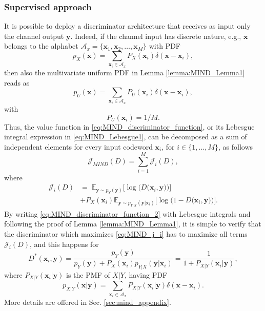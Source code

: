 \subsubsection{Supervised approach}
It is possible to deploy a discriminator architecture that receives as input only the channel output $\mathbf{y}$. Indeed, if the channel input has discrete nature, e.g., $\mathbf{x}$ belongs to the alphabet $\mathcal{A}_x = \{\mathbf{x}_1, \mathbf{x}_2, \dots, \mathbf{x}_{M}\}$ with PDF 
\begin{equation}
\label{eq:MIND_px}
        p_X(\mathbf{x})=\sum_{\mathbf{x}_i \in \mathcal{A}_x}{P_X(\mathbf{x}_i)\delta(\mathbf{x}-\mathbf{x}_i)},
\end{equation}
then also the multivariate uniform PDF in Lemma \ref{lemma:MIND_Lemma1} reads as
\begin{equation}
\label{eq:MIND_pu}
       p_U(\mathbf{x})=\sum_{\mathbf{x}_i \in \mathcal{A}_x}{P_U(\mathbf{x}_i)\delta(\mathbf{x}-\mathbf{x}_i)}, 
\end{equation}
with 
\begin{equation}
    \label{eq:MIND_1/M}
    P_U(\mathbf{x}_i)=1/M.
\end{equation}
Thus, the value function in \eqref{eq:MIND_discriminator_function}, or its Lebesgue integral expression in \eqref{eq:MIND_Lebesgue1}, can be decomposed as a sum of independent elements for every input codeword $\mathbf{x}_i$, for $i\in \{1,\dots,M\}$, as follows
\begin{equation}
\label{eq:MIND_j_i}
\mathcal{J}_{MIND}(D) = \sum_{i = 1}^{M}{\mathcal{J}_i(D)},
\end{equation}
where 
\begin{align}
\label{eq:MIND_discriminator_function_2}
\mathcal{J}_{i}(D) &= \; \mathbb{E}_{\mathbf{y} \sim p_{Y}(\mathbf{y})}\biggl[\log \biggl(D\bigl(\mathbf{x}_i,\mathbf{y}\bigr)\biggr)\biggr] \\ \nonumber
&+P_{X}(\mathbf{x}_i)\mathbb{E}_{\mathbf{y} \sim p_{Y|X}(\mathbf{y}|\mathbf{x}_i)}\biggl[\log \biggl(1-D\bigl(\mathbf{x}_i,\mathbf{y}\bigr)\biggr)\biggr].
\end{align}
By writing \eqref{eq:MIND_discriminator_function_2} with Lebesgue integrals and following the proof of Lemma \ref{lemma:MIND_Lemma1}, it is simple to verify that the discriminator which maximizes \eqref{eq:MIND_j_i} has to maximize all terms $\mathcal{J}_{i}(D)$, and this happens for 
\begin{equation}
\label{eq:MIND_metric}
D^*(\mathbf{x}_i,\mathbf{y}) = \frac{p_{Y}(\mathbf{y})}{p_{Y}(\mathbf{y}) + P_{X}(\mathbf{x}_i)p_{Y|X}(\mathbf{y}|\mathbf{x}_i)} = \frac{1}{1 + P_{X|Y}(\mathbf{x}_i|\mathbf{y})},
\end{equation}
where $P_{X|Y}(\mathbf{x}_i|\mathbf{y})$ is the PMF of $X|Y$,
having PDF
\begin{equation}
    p_{X|Y}(\mathbf{x}|\mathbf{y})=\sum_{\mathbf{x}_i \in \mathcal{A}_x}{P_{X|Y}(\mathbf{x}_i|\mathbf{y})\delta(\mathbf{x}-\mathbf{x}_i)}.
\end{equation}
More details are offered in Sec. \ref{sec:mind_appendix}.

